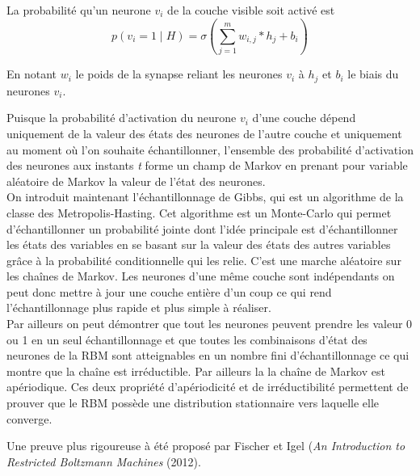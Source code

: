 \documentclass[a4paper,oneside]{report}
\begin{document}
                La probabilité qu'un neurone \begin{math}v_{i}\end{math} de la
                couche visible soit activé est \begin{equation}p( v_{i} =1 \mid H) = 
\sigma(\sum_{j=1}^{m} w_{i,j} * h_{j} + b_{i}) \end{equation}

				En notant \textit{$w_{i}$} le poids de la synapse reliant les neurones \textit{$v_{i}$} 
à \textit{$h_{j}$} et \textit{$b_{i}$} le biais du neurones \textit{$v_{i}$}.
        
					Puisque la probabilité  d'activation du neurone \textit{$v_{i}$} d'une couche dépend 
uniquement de la valeur des états des neurones de l'autre couche et uniquement au 
moment où l'on souhaite 
échantillonner, l'ensemble des probabilité d'activation des neurones aux instants \textit{t} forme 
un champ de Markov en prenant pour variable aléatoire de Markov la valeur de l'état des neurones.\\

	     On introduit maintenant l'échantillonnage de Gibbs, qui est un
                algorithme de la classe des Metropolis-Hasting. Cet algorithme
                est un Monte-Carlo qui permet d'échantillonner un probabilité jointe dont l'idée principale
                est d'échantillonner les états des variables en se basant sur la valeur des états
                des autres variables grâce à la probabilité conditionnelle qui les relie. C'est une marche aléatoire sur les chaînes de Markov.
Les neurones d'une même couche sont indépendants on peut donc mettre à jour une couche 
entière d'un coup ce qui rend l'échantillonnage plus rapide et plus simple à réaliser. \\

Par ailleurs on peut démontrer que tout les neurones peuvent prendre les valeur 0 ou 1
 en un seul échantillonnage et que toutes les combinaisons d'état des neurones de la RBM 
sont atteignables en un nombre fini d'échantillonnage ce qui montre que la chaîne est irréductible. Par ailleurs la la chaîne de Markov est apériodique. 
Ces deux propriété d'apériodicité et de irréductibilité permettent de prouver que le RBM
 possède une distribution stationnaire vers laquelle elle converge. 

Une preuve plus rigoureuse à été proposé par Fischer et Igel (\textit{An Introduction to Restricted Boltzmann Machines} (2012).\\
\end{document}
